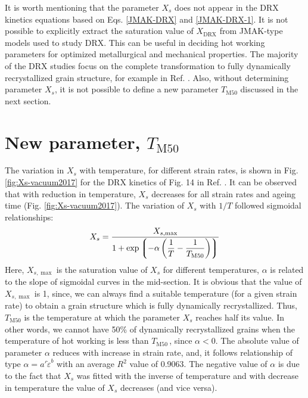 \documentclass[a4paper, 11pt, dvipsnames]{article}
\begin{document}
It is worth mentioning that the parameter $X_s$ does not appear in the DRX kinetics equations based on Eqs. \eqref{JMAK-DRX} and \eqref{JMAK-DRX-1}. It is not possible to explicitly extract the saturation value of $X_{\text{DRX}}$ from JMAK-type models used to study DRX. This can be useful in deciding hot working parameters for optimized metallurgical and mechanical properties. The majority of the DRX studies focus on the complete transformation to fully dynamically recrystallized grain structure, for example in Ref. \cite{Z1}. Also, without determining parameter $X_s$, it is not possible to define a new parameter $T_{\text{M50}}$ discussed in the next section. 
\section{New parameter, \texorpdfstring{$T_{\text{M50}}$}{TM50}}
The variation in $X_s$ with temperature, for different strain rates, is shown in Fig. \ref{fig:Xs-vacuum2017} for the DRX kinetics of Fig. 14 in Ref. \cite{X1}. It can be observed that with reduction in temperature, $X_s$ decreases for all strain rates and ageing time (Fig. \ref{fig:Xs-vacuum2017}). The variation of $X_s$ with $1/T$ followed sigmoidal relationships:
\begin{equation}
X_s = \dfrac{X_{s, \max}}{1 + \exp\left\lgroup-\alpha\left(\dfrac{1}{T} - \dfrac{1}{T_{\text{M50}}}\right)\right\rgroup}
\end{equation}
Here, $X_{s, \max}$ is the saturation value of $X_s$ for different temperatures, $\alpha$ is related to the slope of sigmoidal curves in the mid-section. It is obvious that the value of $X_{s, \max}$ is 1, since, we can always find a suitable temperature (for a given strain rate) to obtain a grain structure which is fully dynamically recrystallized. Thus, $T_{\text{M50}}$ is the temperature at which the parameter $X_s$ reaches half its value. In other words, we cannot have 50\% of dynamically recrystallized grains when the temperature of hot working is less than $T_{\text{M50}}\,$, since $\alpha < 0$. The absolute value of parameter $\alpha$ reduces with increase in strain rate, and, it follows relationship of type $\alpha = a'\dot{\varepsilon}^b$ with an average $R^2$ value of 0.9063. The negative value of $\alpha$ is due to the fact that $X_s$ was fitted with the inverse of temperature and with decrease in temperature the value of $X_s$ decreases (and vice versa). 
\end{document}
